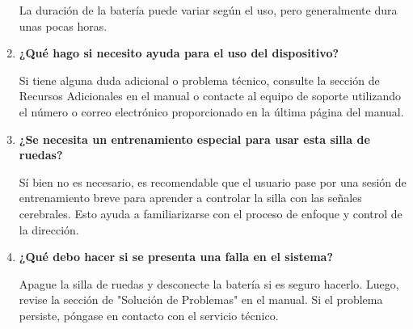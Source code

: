 \documentclass{article}
\begin{document}
\begin{enumerate}
    La duración de la batería puede variar según el uso, pero generalmente dura unas pocas horas.
    \item \textbf{¿Qué hago si necesito ayuda para el uso del dispositivo?}
    
    Si tiene alguna duda adicional o problema técnico, consulte la sección de Recursos Adicionales en el manual o contacte al equipo de soporte utilizando el número o correo electrónico proporcionado en la última página del manual.
    \item \textbf{¿Se necesita un entrenamiento especial para usar esta silla de ruedas?}
    
    Sí bien no es necesario, es recomendable que el usuario pase por una sesión de entrenamiento breve para aprender a controlar la silla con las señales cerebrales. Esto ayuda a familiarizarse con el proceso de enfoque y control de la dirección.
    \item \textbf{¿Qué debo hacer si se presenta una falla en el sistema?}
    
    Apague la silla de ruedas y desconecte la batería si es seguro hacerlo. Luego, revise la sección de "Solución de Problemas" en el manual. Si el problema persiste, póngase en contacto con el servicio técnico.
\end{enumerate}
\newpage
\end{document}
